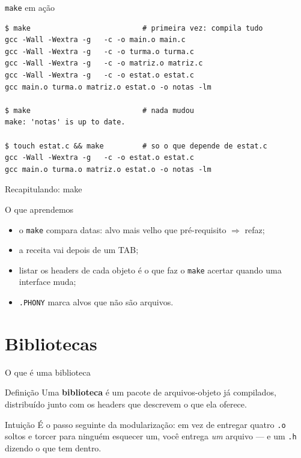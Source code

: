 \documentclass[aspectratio=169]{beamer}
\begin{document}
\begin{frame}[fragile]{\texttt{make} em ação}
\begin{lstlisting}[style=shellStyle]
$ make                          # primeira vez: compila tudo
gcc -Wall -Wextra -g   -c -o main.o main.c
gcc -Wall -Wextra -g   -c -o turma.o turma.c
gcc -Wall -Wextra -g   -c -o matriz.o matriz.c
gcc -Wall -Wextra -g   -c -o estat.o estat.c
gcc main.o turma.o matriz.o estat.o -o notas -lm

$ make                          # nada mudou
make: 'notas' is up to date.

$ touch estat.c && make         # so o que depende de estat.c
gcc -Wall -Wextra -g   -c -o estat.o estat.c
gcc main.o turma.o matriz.o estat.o -o notas -lm
\end{lstlisting}
\end{frame}

\begin{frame}{Recapitulando: make}
  \begin{block}{O que aprendemos}
    \begin{itemize}
      \item o \texttt{make} compara datas: alvo mais velho que
        pré-requisito $\Rightarrow$ refaz;
      \item a receita vai depois de um TAB;
      \item listar os headers de cada objeto é o que faz o
        \texttt{make} acertar quando uma interface muda;
      \item \texttt{.PHONY} marca alvos que não são arquivos.
    \end{itemize}
  \end{block}
\end{frame}

\section{Bibliotecas}

\begin{frame}{O que é uma biblioteca}
  \begin{block}{Definição}
    Uma \textbf{biblioteca} é um pacote de arquivos-objeto já compilados,
    distribuído junto com os headers que descrevem o que ela oferece.
  \end{block}
  \begin{exampleblock}{Intuição}
    É o passo seguinte da modularização: em vez de entregar quatro
    \texttt{.o} soltos e torcer para ninguém esquecer um, você entrega
    \emph{um} arquivo --- e um \texttt{.h} dizendo o que tem dentro.
  \end{exampleblock}
\end{frame}
\end{document}
